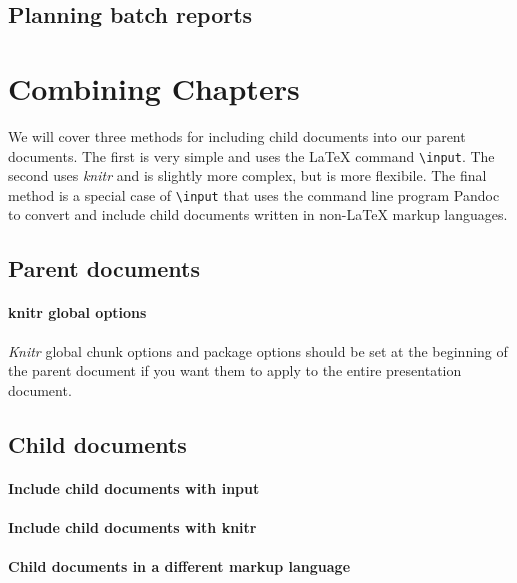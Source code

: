 \subsection{Planning batch reports}

\section{Combining Chapters}

We will cover three methods for including child documents into our parent documents. The first is very simple and uses the LaTeX command \texttt{\textbackslash{}input}. The second uses {\emph{knitr}} and is slightly more complex, but is more flexibile. The final method is a special case of \texttt{\textbackslash{}input} that uses the command line program Pandoc  to convert and include child documents written in non-LaTeX markup languages. 

\subsection{Parent documents}

\paragraph{knitr global options}
{\emph{Knitr}} global chunk options and package options should be set at the beginning of the parent document if you want them to apply to the entire presentation document. 

\subsection{Child documents}

\paragraph{Include child documents with input}

\paragraph{Include child documents with knitr}

\paragraph{Child documents in a different markup language}


